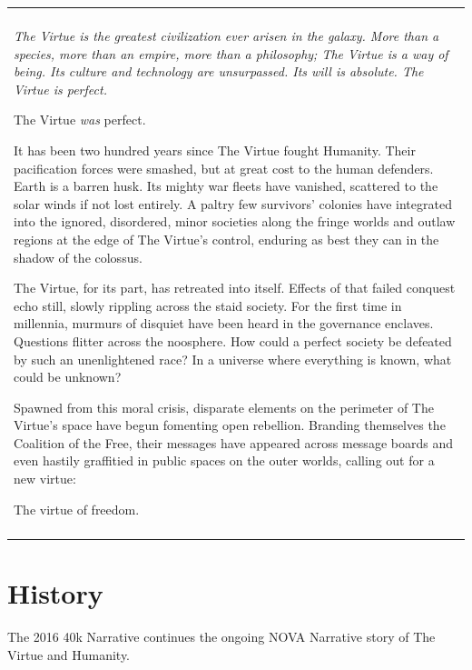 \documentclass{novanarrative}
\begin{document}
\bigskip
\begin{center}  
\begin{tabular}{L{6in}}
  \hline\\
  {\it
  The Virtue is the greatest civilization ever arisen in the galaxy.
  More than a species, more than an empire, more than a philosophy; The
  Virtue is a way of being.  Its culture and technology
  are unsurpassed.  Its will is absolute.  The Virtue is perfect.

  \bigskip
  The Virtue \emph{was} perfect.

  \bigskip
  It has been two hundred years since The Virtue fought Humanity.  Their
  pacification forces were smashed, but at great cost to the human
  defenders.  Earth is a barren husk.  Its mighty war fleets have
  vanished, scattered to the solar winds if not lost entirely.  A paltry
  few survivors' colonies have integrated into the ignored, disordered, minor
  societies along the fringe worlds and outlaw regions at the edge of The Virtue's control,
  enduring as best they can
  in the shadow of the colossus.

  \smallskip
  The Virtue, for its part, has retreated into itself.  Effects of that
  failed conquest echo still, slowly rippling across the staid society.
  For the first time in millennia, murmurs of disquiet have been heard
  in the governance enclaves.  Questions flitter across the noosphere.
  How could a perfect society be defeated by such an unenlightened race?
  In a universe where everything is known, what could be unknown?

  \smallskip
  Spawned from this moral crisis, disparate elements on the perimeter of
  The Virtue's space have begun fomenting open rebellion.  Branding themselves
  the Coalition of the Free, their messages have appeared across
  message boards and even hastily graffitied in public spaces on the
  outer worlds, calling out for a new virtue:

  \bigskip
  \centerline{The virtue of freedom.}
  }
  \\
  \hline\\
\end{tabular}
\end{center}

\section{History}

The 2016 40k Narrative continues the ongoing NOVA Narrative story of
The Virtue and Humanity.
\end{document}

